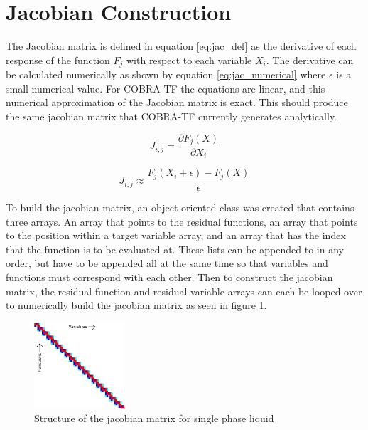    \section{Jacobian Construction}
    
    The Jacobian matrix is defined in equation \eqref{eq:jac_def} as the derivative
    of each response of the function $F_{j}$ with respect to each variable $X_{i}$.
    The derivative can be calculated numerically as shown by equation
    \eqref{eq:jac_numerical} where $\epsilon$ is a small numerical value. For
    COBRA-TF the equations are linear, and this numerical approximation
    of the Jacobian matrix is exact. This should produce the same jacobian
    matrix that COBRA-TF currently generates analytically. 
    
    \begin{equation}
    	\label{eq:jac_def}
    	J_{i,j}=\frac{ \partial F_{j}(X)}{\partial X_{i}}
    \end{equation}
    
    \begin{equation}
    	\label{eq:jac_numerical}
    	J_{i,j}  \approx \frac{F_{j}(X_{i}+\epsilon)-F_{j}(X)}{\epsilon}
    \end{equation}
    
    To build the jacobian matrix, an object oriented class was created that
    contains three arrays. An array that points to the residual functions, an
    array that points to the position within a target variable array, and an
    array that has the index that the function is to be evaluated at. These
    lists can be appended to in any order, but have to be appended all at the
    same time so that variables and functions must correspond with each other.
    Then to construct the jacobian matrix, the residual function and residual
    variable arrays can each be looped over to numerically build the jacobian
    matrix as seen in figure \ref{fig:Jacobian_Setup}. 
    
    \begin{figure}[!h]
    	\centering
    	\includegraphics[width=0.30\textwidth]{images/Jacobian_Setup}
    	\caption{Structure of the jacobian matrix for single phase liquid}
    	\label{fig:Jacobian_Setup}
    \end{figure}


